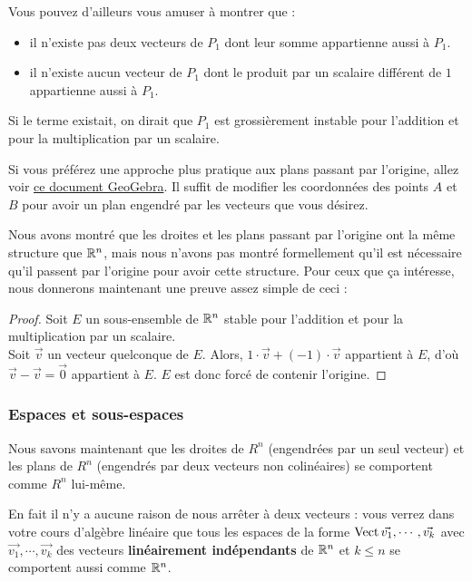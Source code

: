 Vous pouvez d'ailleurs vous amuser à montrer que :

\begin{itemize}
    \item il n'existe pas deux vecteurs de $P_1$ dont leur somme appartienne aussi à $P_1$.
    \item il n'existe aucun vecteur de $P_1$ dont le produit par un scalaire différent de $1$ appartienne aussi à $P_1$.
\end{itemize}

Si le terme existait, on dirait que $P_1$ est grossièrement instable pour l'addition et pour la multiplication par un scalaire.

Si vous préférez une approche plus pratique aux plans passant par l'origine, allez voir \href{https://www.geogebra.org/3d/gscy7h3z}{ce document GeoGebra}. Il suffit de modifier les coordonnées des points $A$ et $B$ pour avoir un plan engendré par les vecteurs que vous désirez.

Nous avons montré que les droites et les plans passant par l'origine ont la même structure que $\mathbb{R}^n$, mais nous n'avons pas montré formellement qu'il est nécessaire qu'il passent par l'origine pour avoir cette structure. Pour ceux que ça intéresse, nous donnerons maintenant une preuve assez simple de ceci :

\begin{proof}
    Soit $E$ un sous-ensemble de $\mathbb{R}^n$ stable pour l'addition et pour la multiplication par un scalaire.\\
    Soit $\vec{v}$ un vecteur quelconque de $E$. Alors, $1\cdot\vec{v}+(-1)\cdot\vec{v}$ appartient à $E$, d'où $\vec{v}-\vec{v}=\vec{0}$ appartient à $E$. $E$ est donc forcé de contenir l'origine.
\end{proof}

\subsubsection{Espaces et sous-espaces}
Nous savons maintenant que les droites de $R^n$ (engendrées par un seul vecteur) et les plans de $R^n$ (engendrés par deux vecteurs non colinéaires) se comportent comme $R^n$ lui-même. 

En fait il n'y a aucune raison de nous arrêter à deux vecteurs : vous verrez dans votre cours d'algèbre linéaire que tous les espaces de la forme $\operatorname{Vect}{\vec{v_1},\cdots,\vec{v_k}}$ avec $\vec{v_1},\cdots,\vec{v_k}$ des vecteurs \textbf{linéairement indépendants} de $\mathbb{R}^n$ et $k \leq n$ se comportent aussi comme $\mathbb{R}^n$.

